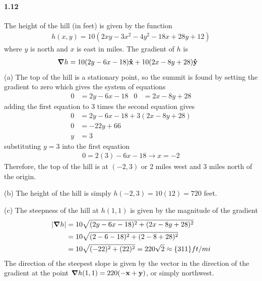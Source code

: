 \documentclass[../main.tex]{subfiles}
\begin{document}
\paragraph{1.12}
The height of the hill (in feet) is given by the function
\begin{align*}
    h(x, y) = 10 (2xy - 3x^2 - 4y^2 - 18x + 28y + 12)
\end{align*}
where $y$ is north and $x$ is east in miles. The gradient of $h$ is
\begin{align*}
    \grad{h} &= 10 (2y - 6x - 18) \vu{x} + 10 (2x - 8y + 28) \vu{y}
\end{align*}
(a) The top of the hill is a stationary point, so the summit is found by setting the gradient to
zero which gives the system of equations
\begin{align*}
    0 &= 2y - 6x - 18 & 0 &= 2x - 8y + 28
\end{align*}
adding the first equation to 3 times the second equation gives
\begin{align*}
    0 &= 2y - 6x - 18 + 3(2x - 8y + 28) \\
    0 &= -22y + 66 \\
    y &= 3
\end{align*}
substituting $y = 3$ into the first equation
\begin{align*}
    0 = 2(3) - 6x - 18 \to x = -2
\end{align*}
Therefore, the top of the hill is at $(-2, 3)$ or 2 miles west and 3 miles north of the origin.

(b) The height of the hill is simply $h(-2, 3) = 10(12) = 720$ feet.

(c) The steepness of the hill at $h(1,1)$ is given by the magnitude of the gradient
\begin{align*}
    \abs{\grad{h}} &= 10\sqrt{(2y - 6x - 18)^2 + (2x - 8y + 28)^2} \\
    &= 10\sqrt{(2 - 6 - 18)^2 + (2 - 8 + 28)^2} \\
    &= 10\sqrt{(-22)^2 + (22)^2} = 220 \sqrt{2} \approx \qty{311}{ft/mi}
\end{align*}
The direction of the steepest slope is given by the vector in the direction of the gradient
at the point $\grad{h(1,1)} = 220(-\vb{x} + \vb{y})$, or simply northwest.
\end{document}
